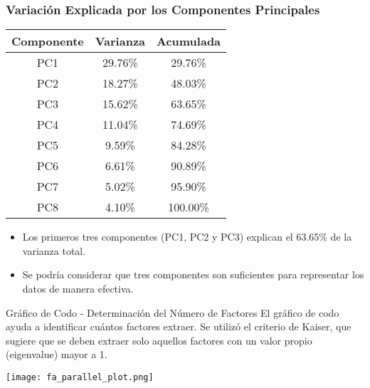 \documentclass[
	11pt, %
]{beamer}
\begin{document}
\begin{frame}
\frametitle{Variación Explicada por los Componentes Principales}

\begin{table}[ht]
\centering
\scriptsize
\begin{tabular}{|c|c|c|}
\hline
\textbf{Componente} & \textbf{Varianza} & \textbf{Acumulada} \\ \hline
PC1 & 29.76\% & 29.76\% \\ \hline
PC2 & 18.27\% & 48.03\% \\ \hline
PC3 & 15.62\% & 63.65\% \\ \hline
PC4 & 11.04\% & 74.69\% \\ \hline
PC5 & 9.59\% & 84.28\% \\ \hline
PC6 & 6.61\% & 90.89\% \\ \hline
PC7 & 5.02\% & 95.90\% \\ \hline
PC8 & 4.10\% & 100.00\% \\ \hline
\end{tabular}
\end{table}

\begin{itemize}
    \item Los primeros tres componentes (PC1, PC2 y PC3) explican el 63.65\% de la varianza total.
    \item Se podría considerar que tres componentes son suficientes para representar los datos de manera efectiva.
\end{itemize}

\end{frame}


\begin{frame}{Gráfico de Codo - Determinación del Número de Factores}
  El gráfico de codo ayuda a identificar cuántos factores extraer. Se utilizó el criterio de Kaiser, que sugiere que se deben extraer solo aquellos factores con un valor propio (eigenvalue) mayor a 1.
    
    
    \begin{center}
        \texttt{[image: fa\_parallel\_plot.png]} %
    \end{center}
\end{frame}
\end{document}
